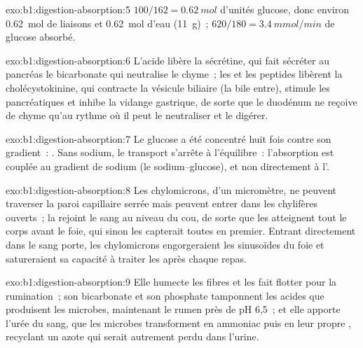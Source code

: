 \begin{solution}{exo:b1:digestion-absorption:5}
$100/162 = \qty{0.62}{mol}$ d'unités glucose, donc environ
\qty{0.62}{mol} de liaisons et \qty{0.62}{mol} d'eau (\qty{11}{g})~;
$620/180 = \qty{3.4}{mmol/min}$ de glucose absorbé.
\end{solution}

\begin{solution}{exo:b1:digestion-absorption:6}
L'acide libère la sécrétine, qui fait sécréter au pancréas le
bicarbonate qui neutralise le chyme~; les  et les peptides
libèrent la cholécystokinine, qui contracte la vésicule biliaire (la
bile entre), stimule les  pancréatiques et inhibe la vidange
gastrique, de sorte que le duodénum ne reçoive de chyme qu'au rythme où
il peut le neutraliser et le digérer.
\end{solution}

\begin{solution}{exo:b1:digestion-absorption:7}
Le glucose a été concentré huit fois contre son gradient~: . Sans sodium, le transport s'arrête à l'équilibre~: l'absorption
est couplée au gradient de sodium (le  sodium--glucose), et
non directement à l'.
\end{solution}

\begin{solution}{exo:b1:digestion-absorption:8}
Les chylomicrons, d'un micromètre, ne peuvent traverser la paroi
capillaire serrée mais peuvent entrer dans les chylifères ouverts~; la
 rejoint le sang au niveau du cou, de sorte que les 
atteignent tout le corps avant le foie, qui sinon les capterait toutes
en premier. Entrant directement dans le sang porte, les chylomicrons
engorgeraient les sinusoïdes du foie et satureraient sa capacité à
traiter les  après chaque repas.
\end{solution}

\begin{solution}{exo:b1:digestion-absorption:9}
Elle humecte les fibres et les fait flotter pour la rumination~; son
bicarbonate et son phosphate tamponnent les acides que produisent les
microbes, maintenant le rumen près de pH 6,5~; et elle apporte l'urée
du sang, que les microbes transforment en ammoniac puis en leur propre
, recyclant un azote qui serait autrement perdu dans l'urine.
\end{solution}


